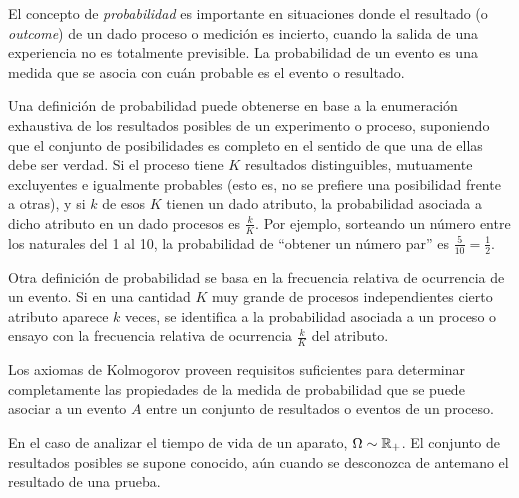 \label{s:MP:Probabilidad}

El  concepto  de  {\it  probabilidad}  es importante  en  situaciones  donde  el
resultado (o {\it outcome}) de un  dado proceso o medici\'on es incierto, cuando
la salida de una experiencia no  es totalmente previsible. La probabilidad de un
evento es una medida que se asocia con cu\'an probable es el evento o resultado.

Una  definici\'on de  probabilidad puede  obtenerse en  base a  la enumeraci\'on
exhaustiva de los resultados posibles de un experimento o proceso,
suponiendo que el conjunto de posibilidades es completo en el sentido de que una
de  ellas debe ser  verdad. Si  el proceso  tiene $K$  resultados distinguibles,
mutuamente  excluyentes e  igualmente probables  (esto  es, no  se prefiere  una
posibilidad frente a  otras), y si $k$  de esos $K$ tienen un  dado atributo, la
probabilidad asociada a dicho atributo en un dado procesos es $\frac{k}{K}$. Por
ejemplo, sorteando un n\'umero entre los  naturales del 1 al 10, la probabilidad
de ``obtener un n\'umero par'' es $\frac5{10} = \frac12$.

Otra  definici\'on  de  probabilidad  se  basa  en  la  frecuencia  relativa  de
ocurrencia  de  un evento.   Si  en  una cantidad  $K$  muy  grande de  procesos
independientes  cierto   atributo  aparece  $k$   veces,  se  identifica   a  la
probabilidad  asociada a  un  proceso o  ensayo  con la  frecuencia relativa  de
ocurrencia $\frac{k}{K}$ del atributo.

Los  axiomas  de  Kolmogorov  proveen  requisitos  suficientes  para  determinar
completamente las propiedades de la medida de probabilidad  que se
puede asociar a  un evento $A$ entre  un conjunto de resultados o  eventos de un
proceso.

En el caso de analizar el tiempo de vida de un aparato, $\Omega \sim \mathbb{R}_+$.
El  conjunto  de  resultados  posibles  se  supone  conocido,  a\'un  cuando  se
desconozca de antemano el resultado de una prueba.


